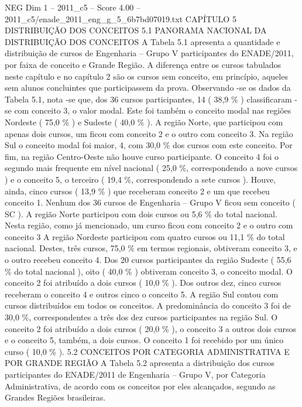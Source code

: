 \begin{textsample}{NEG Dim 1 – 2011\_c5 – Score 4.00 – 2011\_c5/enade\_2011\_eng\_g\_5\_6b7bd07019.txt}  \label{ex:f1_neg_320}
CAPÍTULO 5 DISTRIBUIÇÃO DOS CONCEITOS 5.1 PANORAMA NACIONAL DA DISTRIBUIÇÃO DOS CONCEITOS A Tabela 5.1 apresenta a quantidade e distribuição de cursos de Engenharia – Grupo V participantes do ENADE/2011, por faixa de conceito e Grande Região.
A diferença entre os cursos tabulados neste capítulo e no capítulo 2 são os cursos sem conceito, em princípio, aqueles sem alunos concluintes que participassem da prova.
Observando -se os dados da Tabela 5.1, nota -se que, dos 36 cursos participantes, 14 ( 38,9 \% ) classificaram -se com conceito 3, o valor modal.
Este foi também o conceito modal nas regiões Nordeste ( 75,0 \% ) e Sudeste ( 40,0 \% ).
A região Norte, que participou com apenas dois cursos, um ficou com conceito 2 e o outro com conceito 3.
Na região Sul o conceito modal foi maior, 4, com 30,0 \% dos cursos com este conceito.
Por fim, na região Centro-Oeste não houve curso participante.
O conceito 4 foi o segundo mais frequente em nível nacional ( 25,0 \%, correspondendo a nove cursos ) e o conceito 5, o terceiro ( 19,4 \%, correspondendo a sete cursos ).
Houve, ainda, cinco cursos ( 13,9 \% ) que receberam conceito 2 e um que recebeu conceito 1.
Nenhum dos 36 cursos de Engenharia – Grupo V ficou sem conceito ( SC ).
A região Norte participou com dois cursos ou 5,6 \% do total nacional.
Nesta região, como já mencionado, um curso ficou com conceito 2 e o outro com conceito 3 A região Nordeste participou com quatro cursos ou 11,1 \% do total nacional.
Destes, três cursos, 75,0 \% em termos regionais, obtiveram conceito 3, e o outro recebeu conceito 4.
Dos 20 cursos participantes da região Sudeste ( 55,6 \% do total nacional ), oito ( 40,0 \% ) obtiveram conceito 3, o conceito modal.
O conceito 2 foi atribuído a dois cursos ( 10,0 \% ).
Dos outros dez, cinco cursos receberam o conceito 4 e outros cinco o conceito 5.
A região Sul contou com cursos distribuídos em todos os conceitos.
A predominância do conceito 3 foi de 30,0 \%, correspondentes a três dos dez cursos participantes na região Sul.
O conceito 2 foi atribuído a dois cursos ( 20,0 \% ), o conceito 3 a outros dois cursos e o conceito 5, também, a dois cursos.
O conceito 1 foi recebido por um único curso ( 10,0 \% ). 5.2 CONCEITOS POR CATEGORIA ADMINISTRATIVA E POR GRANDE REGIÃO A Tabela 5.2 apresenta a distribuição dos cursos participantes do ENADE/2011 de Engenharia – Grupo V, por Categoria Administrativa, de acordo com os conceitos por eles alcançados, segundo as Grandes Regiões brasileiras.

\end{textsample}
